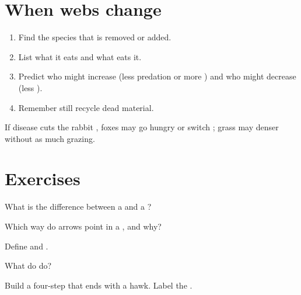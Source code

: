 \section{When webs change}

\begin{method}\label{met:g5:food-webs:knockon}
\begin{enumerate}
  \item Find the species that is removed or added.
  \item List what it eats and what eats it.
  \item Predict who might increase (less predation or more ) and
        who might decrease (less ).
  \item Remember  still recycle dead material.
\end{enumerate}
\end{method}

\begin{example}\label{ex:g5:food-webs:rabbits}
If disease cuts the rabbit , foxes may go hungry or switch
; grass may  denser without as much grazing.
\end{example}

\section{Exercises}

\begin{exercise}[$\star$]\label{exo:g5:food-webs:1}
What is the difference between a  and a ?
\end{exercise}

\begin{exercise}[$\star$]\label{exo:g5:food-webs:2}
Which way do arrows point in a , and why?
\end{exercise}

\begin{exercise}[$\star$]\label{exo:g5:food-webs:3}
Define  and .
\end{exercise}

\begin{exercise}[$\star$]\label{exo:g5:food-webs:4}
What do  do?
\end{exercise}

\begin{exercise}[$\star\star$]\label{exo:g5:food-webs:5}
Build a four-step  that ends with a hawk. Label the .
\end{exercise}

